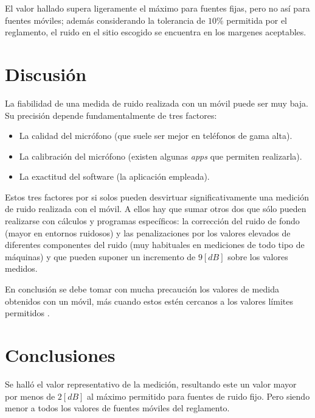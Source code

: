\documentclass[letter,11pt]{article}
\begin{document}
El valor hallado supera ligeramente el máximo para fuentes fijas, pero no así
para fuentes móviles; además considerando la tolerancia de $10\%$ permitida por
el reglamento, el ruido en el sitio escogido se encuentra en los margenes
aceptables.

\section{Discusión}

La fiabilidad de una medida de ruido realizada con un móvil puede ser muy baja.
Su precisión depende fundamentalmente de tres factores:

\begin{itemize}
\item La calidad del micrófono (que suele ser mejor en teléfonos de gama alta).
\item La calibración del micrófono (existen algunas \emph{apps} que permiten
    realizarla).
\item La exactitud del software (la aplicación empleada).
\end{itemize}

Estos tres factores por si solos pueden desvirtuar significativamente una
medición de ruido realizada con el móvil. A ellos hay que sumar otros dos que
sólo pueden realizarse con cálculos y programas específicos: la corrección del
ruido de fondo (mayor en entornos ruidosos) y las penalizaciones por los valores
elevados de diferentes componentes del ruido (muy habituales en mediciones de
todo tipo de máquinas) y que pueden suponer un incremento de $9 [dB]$ sobre los
valores medidos.

En conclusión se debe tomar con mucha precaución los valores de medida obtenidos
con un móvil, más cuando estos estén cercanos a los valores límites permitidos
\cite{ALLPE}.

\section{Conclusiones}

Se halló el valor representativo de la medición, resultando este un valor mayor
por menos de $2 [dB]$ al máximo permitido para fuentes de ruido fijo. Pero
siendo menor a todos los valores de fuentes móviles del reglamento.
\end{document}
